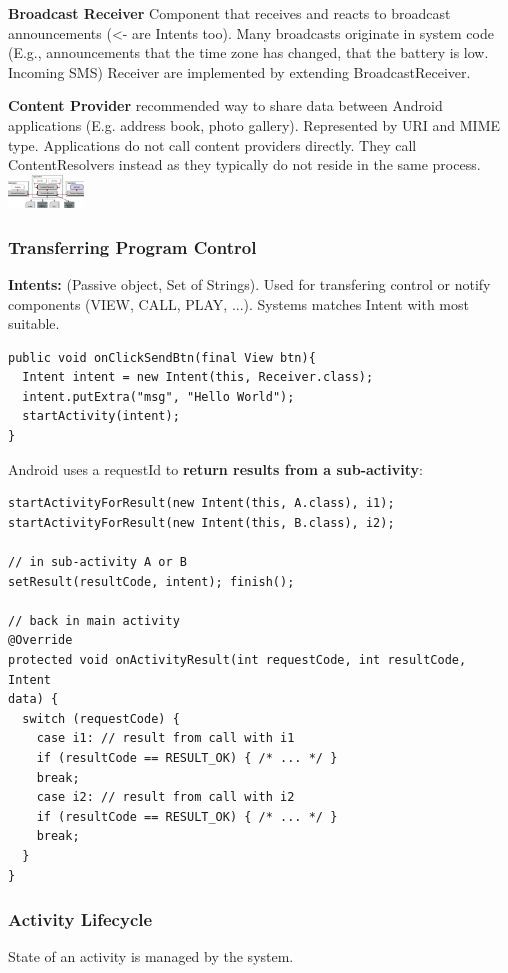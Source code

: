 \textbf{Broadcast Receiver}
Component that receives and reacts to broadcast announcements (<- are Intents too).
Many broadcasts originate in system code (E.g., announcements that the time
zone has changed, that the battery is low. Incoming SMS)
Receiver are implemented by extending BroadcastReceiver.

\textbf{Content Provider}
recommended way to share data between Android applications (E.g. address book,
photo gallery). Represented by URI and MIME type.
Applications do not call content providers directly. They call ContentResolvers
instead as they typically do not reside in the same process.
\includegraphics[width=0.15\textwidth]{android/content_provider.png}

\subsubsection{Transferring Program Control}
\textbf{Intents:} (Passive object, Set of Strings). Used for transfering
control or notify components (VIEW, CALL, PLAY, ...). Systems matches Intent
with most suitable.

\begin{lstlisting}
public void onClickSendBtn(final View btn){
  Intent intent = new Intent(this, Receiver.class);
  intent.putExtra("msg", "Hello World");
  startActivity(intent);
}
\end{lstlisting}

Android uses a requestId to \textbf{return results from a sub-activity}:
\begin{lstlisting}
startActivityForResult(new Intent(this, A.class), i1);
startActivityForResult(new Intent(this, B.class), i2);

// in sub-activity A or B
setResult(resultCode, intent); finish();

// back in main activity
@Override
protected void onActivityResult(int requestCode, int resultCode, Intent
data) {
  switch (requestCode) {
    case i1: // result from call with i1
    if (resultCode == RESULT_OK) { /* ... */ }
    break;
    case i2: // result from call with i2
    if (resultCode == RESULT_OK) { /* ... */ }
    break;
  }
}
\end{lstlisting}

\subsubsection{Activity Lifecycle}
State of an activity is managed by the system.

